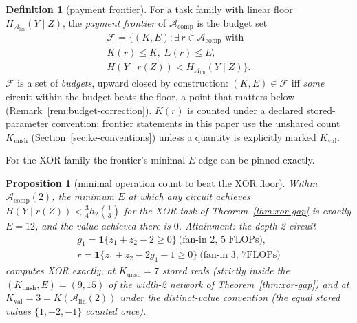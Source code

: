 \documentclass[twocolumn,10pt]{article}
\newtheorem{proposition}[theorem]{Proposition}
\theoremstyle{definition}
\newtheorem{definition}[theorem]{Definition}
\theoremstyle{remark}
\newcommand{\cA}{\mathcal{A}}
\newcommand{\cF}{\mathcal{F}}
\newcommand{\Alin}{\cA_{\mathrm{lin}}}
\newcommand{\hb}{h_2}
\newcommand{\Kunsh}{K_{\mathrm{unsh}}}
\newcommand{\Kval}{K_{\mathrm{val}}}
\begin{document}
\begin{definition}[payment frontier]
\label{def:frontier}
For a task family with linear floor $H_{\Alin}(Y \mid Z)$, the
\emph{payment frontier} of $\cA_{\mathrm{comp}}$ is the budget set
\begin{multline*}
\cF = \big\{(K, E) : \exists\, r \in \cA_{\mathrm{comp}} \text{ with } \\
K(r) \le K,\ E(r) \le E, \\
H(Y \mid r(Z)) < H_{\Alin}(Y \mid Z)\big\}.
\end{multline*}
$\cF$ is a set of \emph{budgets}, upward closed by construction:
$(K, E) \in \cF$ iff \emph{some} circuit within the budget beats the
floor, a point that matters below
(Remark~\ref{rem:budget-correction}). $K(r)$ is counted under a
declared stored-parameter convention; frontier statements in this
paper use the unshared count $\Kunsh$
(Section~\ref{sec:ke-conventions}) unless a quantity is explicitly
marked $\Kval$.
\end{definition}

For the XOR family the frontier's minimal-$E$ edge can be pinned
exactly.

\begin{proposition}[minimal operation count to beat the XOR floor]
\label{prop:minE}
Within $\cA_{\mathrm{comp}}(2)$, the minimum $E$ at which any circuit
achieves $H(Y \mid r(Z)) < \tfrac34 \hb(\tfrac13)$ for the XOR task of
Theorem~\ref{thm:xor-gap} is exactly $E = 12$, and the value achieved
there is $0$. Attainment: the depth-2 circuit
\begin{gather*}
g_1 = \mathbf 1\{z_1 + z_2 - 2 \ge 0\} \ \text{(fan-in 2, $5$ FLOPs)},
\\
r = \mathbf 1\{z_1 + z_2 - 2 g_1 - 1 \ge 0\} \ \text{(fan-in 3, $7$
FLOPs)}
\end{gather*}
computes XOR exactly, at $\Kunsh = 7$ stored reals (strictly
inside the $(\Kunsh, E) = (9, 15)$ of the width-2 network of
Theorem~\ref{thm:xor-gap}) and at $\Kval = 3 = K(\Alin(2))$ under
the distinct-value convention (the equal stored values
$\{1, -2, -1\}$ counted once).
\end{proposition}
\end{document}
